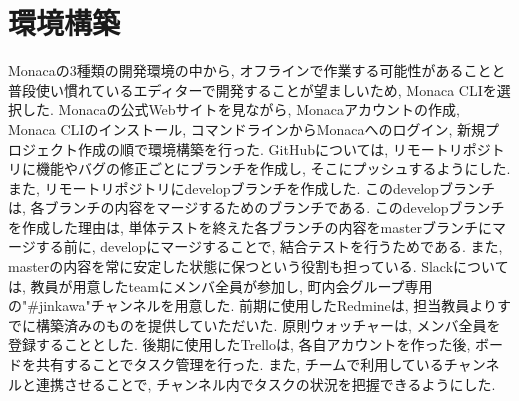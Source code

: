 
\section{環境構築}%
Monacaの3種類の開発環境の中から, オフラインで作業する可能性があることと普段使い慣れているエディターで開発することが望ましいため, Monaca CLIを選択した. Monacaの公式Webサイト\cite{tutorial_monaca_CLI}を見ながら, Monacaアカウントの作成, Monaca CLIのインストール, コマンドラインからMonacaへのログイン, 新規プロジェクト作成の順で環境構築を行った. GitHubについては, リモートリポジトリに機能やバグの修正ごとにブランチを作成し, そこにプッシュするようにした. また, リモートリポジトリにdevelopブランチを作成した. このdevelopブランチは, 各ブランチの内容をマージするためのブランチである. このdevelopブランチを作成した理由は, 単体テストを終えた各ブランチの内容をmasterブランチにマージする前に, developにマージすることで, 結合テストを行うためである. また, masterの内容を常に安定した状態に保つという役割も担っている. Slackについては, 教員が用意したteamにメンバ全員が参加し, 町内会グループ専用の"\#jinkawa"チャンネルを用意した. 前期に使用したRedmineは, 担当教員よりすでに構築済みのものを提供していただいた. 原則ウォッチャー\cite{Redmine}は, メンバ全員を登録することとした. 後期に使用したTrelloは, 各自アカウントを作った後, ボードを共有することでタスク管理を行った. また, チームで利用しているチャンネルと連携させることで, チャンネル内でタスクの状況を把握できるようにした.

